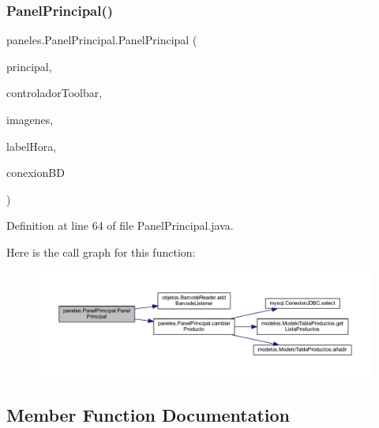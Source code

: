 \subsubsection{\texorpdfstring{Panel\+Principal()}{PanelPrincipal()}}
{\footnotesize\ttfamily paneles.\+Panel\+Principal.\+Panel\+Principal (\begin{DoxyParamCaption}\item[{\mbox{\hyperlink{classvistas_1_1_principal}{Principal}}}]{principal,  }\item[{\mbox{\hyperlink{classcontroladores_1_1_controlador_toolbar}{Controlador\+Toolbar}}}]{controlador\+Toolbar,  }\item[{\mbox{\hyperlink{classimagenes_1_1_imagenes}{Imagenes}}}]{imagenes,  }\item[{J\+Label}]{label\+Hora,  }\item[{\mbox{\hyperlink{classmysql_1_1_conexion_j_d_b_c}{Conexion\+J\+D\+BC}}}]{conexion\+BD }\end{DoxyParamCaption})}



Definition at line 64 of file Panel\+Principal.\+java.

Here is the call graph for this function\+:
\nopagebreak
\begin{figure}[H]
\begin{center}
\leavevmode
\includegraphics[width=350pt]{classpaneles_1_1_panel_principal_a8f8bc1a008744e424eec12eae5e0a745_cgraph}
\end{center}
\end{figure}


\subsection{Member Function Documentation}
\mbox{\label{classpaneles_1_1_panel_principal_ad46c27384163d0757eadfe86cf72ee70}} 
